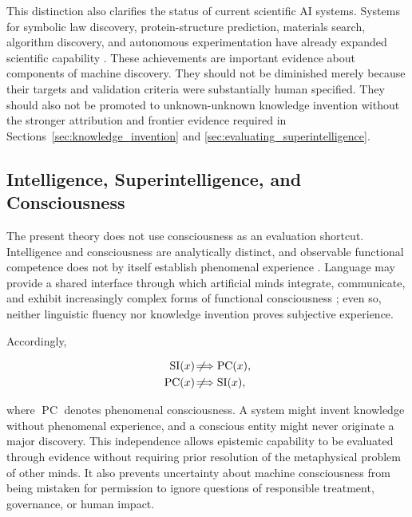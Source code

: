 This distinction also clarifies the status of current scientific AI systems.
Systems for symbolic law discovery, protein-structure prediction, materials
search, algorithm discovery, and autonomous experimentation have already
expanded scientific capability \cite{schmidt2009laws,jumper2021alphafold,
merchant2023materials,fawzi2022alphatensor,boiko2023autonomous}. These
achievements are important evidence about components of machine discovery.
They should not be diminished merely because their targets and validation
criteria were substantially human specified. They should also not be promoted
to unknown-unknown knowledge invention without the stronger attribution and
frontier evidence required in Sections~\ref{sec:knowledge_invention} and
\ref{sec:evaluating_superintelligence}.

\subsection{\textbf{Intelligence, Superintelligence, and Consciousness}}

The present theory does not use consciousness as an evaluation shortcut.
Intelligence and consciousness are analytically distinct, and observable
functional competence does not by itself establish phenomenal experience
\cite{zohourian2026intelligence}. Language may provide a shared interface
through which artificial minds integrate, communicate, and exhibit increasingly
complex forms of functional consciousness \cite{zohourian2026language}; even
so, neither linguistic fluency nor knowledge invention proves subjective
experience.

Accordingly,

\begin{equation}
\begin{aligned}
\operatorname{SI}(x)
&\not\!\Longrightarrow
\operatorname{PC}(x),\\
\operatorname{PC}(x)
&\not\!\Longrightarrow
\operatorname{SI}(x),
\end{aligned}
\label{eq:si_consciousness_independence}
\end{equation}

where $\operatorname{PC}$ denotes phenomenal consciousness. A system might
invent knowledge without phenomenal experience, and a conscious entity might
never originate a major discovery. This independence allows epistemic
capability to be evaluated through evidence without requiring prior resolution
of the metaphysical problem of other minds. It also prevents uncertainty about
machine consciousness from being mistaken for permission to ignore questions
of responsible treatment, governance, or human impact.

